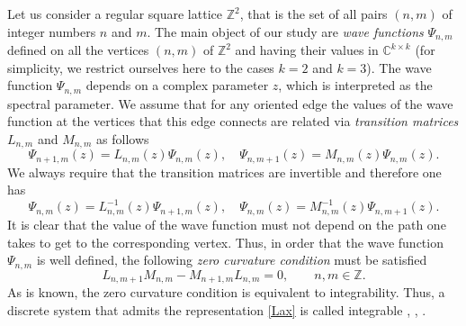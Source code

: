 \documentclass{amsart}
\theoremstyle{remark}
\numberwithin{equation}{section}
\begin{document}
Let us consider a regular square lattice ${{\mathbb Z}}^2$, that is the set of all pairs $(n,m)$ of integer numbers $n$ and $m$.
The main object of our study are {\it wave functions} $\Psi_{n,m}$ defined on all the vertices $(n,m)$ of ${{\mathbb Z}}^2$
and having their values in ${{\mathbb C}}^{k\times k}$ (for simplicity, we restrict ourselves here to the cases $k=2$ and $k=3$).
The wave function $\Psi_{n,m}$ depends on a complex parameter $z$, which is interpreted as the spectral
parameter. We assume that for any oriented edge the values of the wave function at the vertices that this edge connects are related via
{\it transition matrices} $L_{n,m}$ and $M_{n,m}$ as follows
\[
\Psi_{n+1,m}(z)=L_{n,m}(z)\Psi_{n,m}(z), \quad \Psi_{n,m+1}(z)=M_{n,m}(z)\Psi_{n,m}(z).
\]
We always require that the transition matrices are  invertible and therefore one has
 \[
\Psi_{n,m}(z)=L_{n,m}^{-1}(z)\Psi_{n+1,m}(z), \quad \Psi_{n,m}(z)=M_{n,m}^{-1}(z)\Psi_{n,m+1}(z).
\]
It is clear that the value of the wave function must not depend on the path one takes to get to the corresponding vertex. Thus, in order that the wave function $\Psi_{n,m}$ is well defined, the following {\it zero curvature condition}
must be satisfied
\begin{equation}\label{Lax}
L_{n,m+1}M_{n,m}-M_{n+1,m}L_{n,m}=0, \qquad n,m\in{{\mathbb Z}}.
\end{equation}
As is known, the zero curvature condition is equivalent to  integrability. Thus,
a discrete system that admits the representation \eqref{Lax} is called integrable \cite{Adler2001}, \cite{B2004}, \cite{BS2002}.
\end{document}
